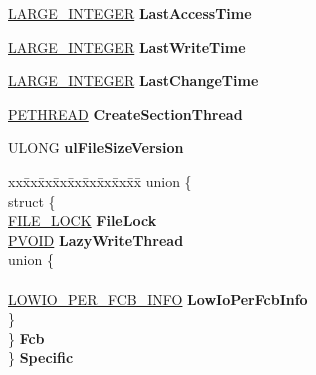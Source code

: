 \begin{DoxyCompactItemize}
\item 
\mbox{\label{struct___f_c_b_ab6ae0617f5a45100710a6ceadc0877aa}} 
\hyperlink{union___l_a_r_g_e___i_n_t_e_g_e_r}{L\+A\+R\+G\+E\+\_\+\+I\+N\+T\+E\+G\+ER} {\bfseries Last\+Access\+Time}
\item 
\mbox{\label{struct___f_c_b_a7efaa3bc6790f9dc2ba1901b1e85841b}} 
\hyperlink{union___l_a_r_g_e___i_n_t_e_g_e_r}{L\+A\+R\+G\+E\+\_\+\+I\+N\+T\+E\+G\+ER} {\bfseries Last\+Write\+Time}
\item 
\mbox{\label{struct___f_c_b_abd41014f3c0c4a772ad67d1471afa007}} 
\hyperlink{union___l_a_r_g_e___i_n_t_e_g_e_r}{L\+A\+R\+G\+E\+\_\+\+I\+N\+T\+E\+G\+ER} {\bfseries Last\+Change\+Time}
\item 
\mbox{\label{struct___f_c_b_a6ddcab5b6955ce18418c081db2c5c050}} 
\hyperlink{struct___e_t_h_r_e_a_d}{P\+E\+T\+H\+R\+E\+AD} {\bfseries Create\+Section\+Thread}
\item 
\mbox{\label{struct___f_c_b_a6bf948daf0eacfc90fda47a1d2ce7bff}} 
U\+L\+O\+NG {\bfseries ul\+File\+Size\+Version}
\item 
\mbox{\label{struct___f_c_b_ad1bf36d86d8518b4cb05c137d4a1be44}} 
\begin{tabbing}
xx\=xx\=xx\=xx\=xx\=xx\=xx\=xx\=xx\=\kill
union \{\\
\>struct \{\\
\>\>\hyperlink{struct___f_i_l_e___l_o_c_k}{FILE\_LOCK} {\bfseries FileLock}\\
\>\>\hyperlink{interfacevoid}{PVOID} {\bfseries LazyWriteThread}\\
\mbox{\label{struct___f_c_b_1_1_0D1582_1_1_0D1585_a7d244ef6b992da4bc3335b717b2f7e97}} 
\>\>union \{\\
\>\>\\
\>\>\>\hyperlink{struct___l_o_w_i_o___p_e_r___f_c_b___i_n_f_o}{LOWIO\_PER\_FCB\_INFO} {\bfseries LowIoPerFcbInfo}\\
\>\>\} \\
\>\} {\bfseries Fcb}\\
\} {\bfseries Specific}\\


\end{tabbing}
\end{DoxyCompactItemize}
